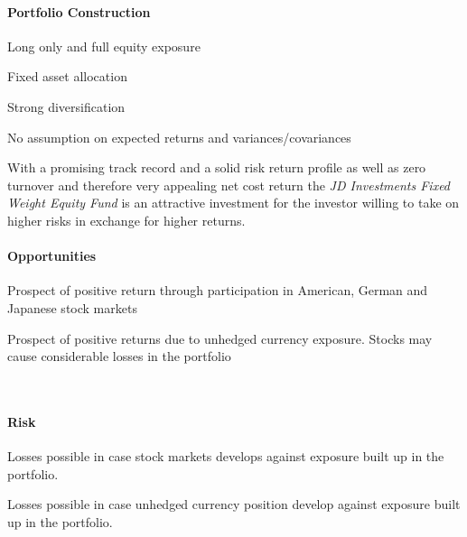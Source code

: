 \documentclass[11pt, parskip=full, DIV=14]{scrreprt}
\begin{document}
\begin{minipage}{0.5\textwidth}
\paragraph{Portfolio Construction}
\begin{sit}
\item	Long only and full equity exposure
\item	Fixed asset allocation
\item	Strong diversification
\item	No assumption on expected returns and variances/covariances
\end{sit}
\end{minipage}
\begin{minipage}{0.5\textwidth}
\end{minipage}


With a promising track record and a solid risk return profile as well as zero turnover and therefore very appealing net cost return the \textit{JD Investments Fixed Weight Equity Fund} is an attractive investment for the investor willing to take on higher risks in exchange for higher returns. 

\begin{minipage}[t]{0.49\textwidth}
  \paragraph{Opportunities}
  \begin{sit}
  \item Prospect of positive return through participation in American, German and Japanese stock markets
  \item Prospect of positive returns due to unhedged currency exposure. Stocks may cause considerable losses in the portfolio
  \end{sit}
\end{minipage}
~~
\begin{minipage}[t]{0.49\textwidth}
  \paragraph{Risk}
  \begin{sit}
  \item Losses possible in case stock markets develops against exposure built up in the portfolio.
  \item Losses possible in case unhedged currency position develop against exposure built up in the portfolio.
  \end{sit}
\end{minipage}
\end{document}

